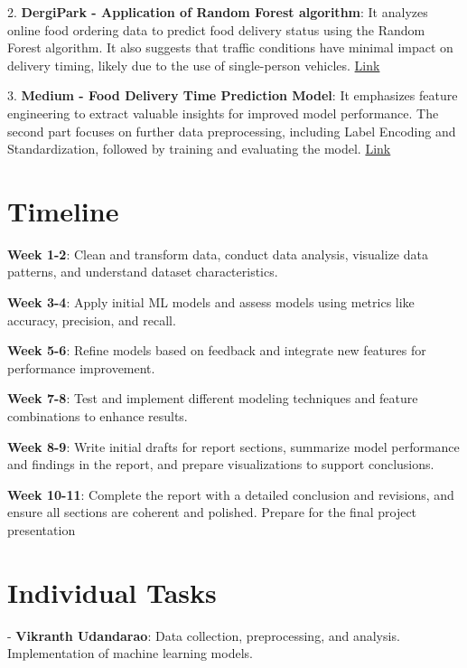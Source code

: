 \documentclass[10pt,twocolumn,letterpaper]{article}
\begin{document}
2. \textbf{DergiPark - Application of Random Forest algorithm}: It analyzes online food ordering data to predict food delivery status using the Random Forest algorithm. It also suggests that traffic conditions have minimal impact on delivery timing, likely due to the use of single-person vehicles. \textcolor{blue}{\href{https://dergipark.org.tr/en/pub/forecasting/issue/60291/842180}{Link}}

3. \textbf{Medium - Food Delivery Time Prediction Model}: It emphasizes feature engineering to extract valuable insights for improved model performance. The second part focuses on further data preprocessing, including Label Encoding and Standardization, followed by training and evaluating the model.
\textcolor{blue}{\href{https://medium.com/@salonijhalani.sj/food-delivery-time-prediction-model-77200d394f2b}{Link}}

\section{Timeline}
\textbf{Week 1-2}: Clean and transform data, conduct data analysis, visualize data patterns, and understand dataset characteristics.

\textbf{Week 3-4}:  Apply initial ML models and assess models using metrics like accuracy, precision, and recall.

\textbf{Week 5-6}: Refine models based on feedback and integrate new features for performance improvement.

\textbf{Week 7-8}: Test and implement different modeling techniques and feature combinations to enhance results.

\textbf{Week 8-9}: Write initial drafts for report sections, summarize model performance and findings in the report, and prepare visualizations to support conclusions.

\textbf{Week 10-11}: Complete the report with a detailed conclusion and revisions, and ensure all sections are coherent and polished. Prepare for the final project presentation

\section{Individual Tasks}
- \textbf{Vikranth Udandarao}: Data collection, preprocessing, and analysis. Implementation of machine learning models.
\end{document}
